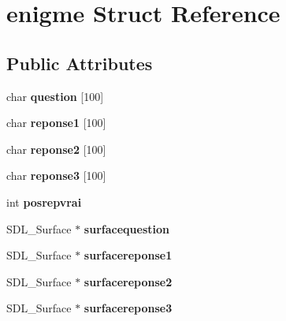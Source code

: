 \hypertarget{structenigme}{}\section{enigme Struct Reference}
\label{structenigme}
\subsection*{Public Attributes}
\begin{DoxyCompactItemize}
\item 
\mbox{\label{structenigme_a87f0c3fc3d649f659d45cca842f7d876}} 
char {\bfseries question} \mbox{[}100\mbox{]}
\item 
\mbox{\label{structenigme_a5f356c0ec3e8201ff39fdf63d8231143}} 
char {\bfseries reponse1} \mbox{[}100\mbox{]}
\item 
\mbox{\label{structenigme_ae9a17a89ddf3fcddd6abb5af82a9f966}} 
char {\bfseries reponse2} \mbox{[}100\mbox{]}
\item 
\mbox{\label{structenigme_a1daa2fec3251a33a193ce86e9ea1dd82}} 
char {\bfseries reponse3} \mbox{[}100\mbox{]}
\item 
\mbox{\label{structenigme_acb9ef5945be8871d9334ebb7bdf68240}} 
int {\bfseries posrepvrai}
\item 
\mbox{\label{structenigme_a31bf140d1f2e4d949257930029bd0fb7}} 
S\+D\+L\+\_\+\+Surface $\ast$ {\bfseries surfacequestion}
\item 
\mbox{\label{structenigme_aee6f482a1fa25ef4e99751352390b52e}} 
S\+D\+L\+\_\+\+Surface $\ast$ {\bfseries surfacereponse1}
\item 
\mbox{\label{structenigme_a3635eecb1c10bc7c2c788dfc75bbfe71}} 
S\+D\+L\+\_\+\+Surface $\ast$ {\bfseries surfacereponse2}
\item 
\mbox{\label{structenigme_a0273f7c3f66d6f72f7d825a774da2b68}} 
S\+D\+L\+\_\+\+Surface $\ast$ {\bfseries surfacereponse3}
\item 
\mbox{\label{structenigme_ac82f5a37ead2707fde4b716bf5d9b9cb}} 

\end{DoxyCompactItemize}
